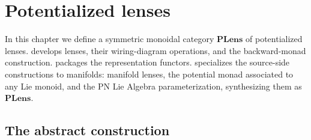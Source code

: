 \documentclass[11pt, oneside, article]{memoir}
\theoremstyle{definition}
\theoremstyle{plain}
\newcommand{\Cat}[1]{\mathbf{#1}}%
\newcommand{\potlens}{\Cat{PLens}}
\begin{document}
\chapter{Potentialized lenses}\label{ch.potentials}

In this chapter we define a symmetric monoidal category $\potlens$ of potentialized lenses.  develops lenses, their wiring-diagram operations, and the backward-monad construction.  packages the representation functors.  specializes the source-side constructions to manifolds: manifold lenses, the potential monad associated to any Lie monoid, and the PN Lie Algebra parameterization, synthesizing them as $\potlens$.

\section{The abstract construction}\label{sec.lenses_general}
\end{document}
